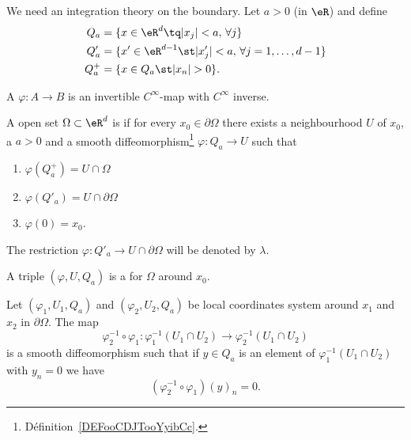We need an integration theory on the boundary. Let \( a>0\) (in \( \eR\)) and define
\begin{subequations}
	\begin{align}
		Q_a   & =\{ x\in \eR^{d}\tq | x_j |<a,\,\forall j \}                   \\
		Q'_a  & =\{ x'\in \eR^{d-1}\st | x'_j |<a,\,\forall j=1,\ldots, d-1 \} \\
		Q^+_a & =\{ x\in Q_a\st | x_n |>0\}.
	\end{align}
\end{subequations}

\begin{definition}          \label{DEFooCDJTooYyibCc}
	A  \( \varphi\colon A\to B\) is an invertible \(  C^{\infty}\)-map with \(  C^{\infty}\) inverse.
\end{definition}

\begin{definition}
	A open set \( \Omega\subset \eR^d\) is  if for every \( x_0\in \partial\Omega\) there exists a neighbourhood \( U\) of \( x_0\), a \( a>0\) and a smooth diffeomorphism\footnote{Définition~\ref{DEFooCDJTooYyibCc}.} \( \varphi\colon Q_a\to U\) such that
	\begin{enumerate}
		\item
		      \( \varphi(Q_a^+)=U\cap\Omega\)
		\item
		      \( \varphi(Q'_a)=U\cap\partial\Omega\)
		\item
		      \( \varphi(0)=x_0\).
	\end{enumerate}
\end{definition}
The restriction \( \varphi\colon Q'_a\to U\cap\partial\Omega\) will be denoted by \( \lambda\).

\begin{definition}
	A triple \( (\varphi,U,Q_a)\) is a  for \( \Omega\) around \( x_0\).
\end{definition}

\begin{lemma}
	Let \( (\varphi_1,U_1,Q_a)\) and \( (\varphi_2,U_2,Q_a)\) be local coordinates system around \( x_1\) and \( x_2\) in \( \partial\Omega\). The map
	\begin{equation}
		\varphi_2^{-1}\circ\varphi_1\colon \varphi_1^{-1}(U_1\cap U_2)\to \varphi_2^{-1}(U_1\cap U_2)
	\end{equation}
	is a smooth diffeomorphism such that if \( y\in Q_a\) is an element of \( \varphi_1^{-1}(U_1\cap U_2)\) with \( y_n=0\) we have
	\begin{equation}
		(\varphi_2^{-1}\circ\varphi_1)(y)_n=0.
	\end{equation}
\end{lemma}

